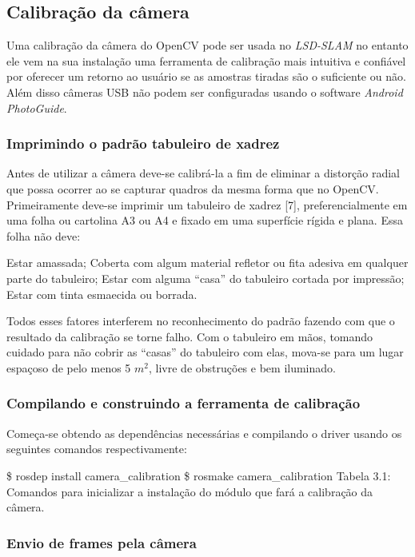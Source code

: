 \subsection{Calibração da câmera}

Uma calibração da câmera do OpenCV pode ser usada no \textit{LSD-SLAM} no entanto ele vem na sua instalação uma ferramenta de calibração mais intuitiva e confiável por oferecer um retorno ao usuário se as amostras tiradas são o suficiente ou não. Além disso câmeras USB não podem ser configuradas usando o software \textit{Android} \textit{PhotoGuide}.

\subsubsection{Imprimindo o padrão tabuleiro de xadrez}

Antes de utilizar a câmera deve-se calibrá-la a fim de eliminar a distorção radial que possa ocorrer ao se capturar quadros da mesma forma que no OpenCV.
Primeiramente deve-se imprimir um tabuleiro de xadrez [7], preferencialmente em uma folha ou cartolina A3 ou A4 e fixado em uma superfície rígida e plana. Essa folha não deve: 

Estar amassada;
Coberta com algum material refletor ou fita adesiva em qualquer parte do tabuleiro;
Estar com alguma “casa” do tabuleiro cortada por impressão;
Estar com tinta esmaecida ou borrada.

Todos esses fatores interferem no reconhecimento do padrão fazendo com que o resultado da calibração se torne falho. Com o tabuleiro em mãos, tomando cuidado para não cobrir as “casas” do tabuleiro com elas, mova-se para um lugar espaçoso de pelo menos 5 $m^2$, livre de obstruções e bem iluminado.

\subsubsection{Compilando e construindo a ferramenta de calibração}

Começa-se obtendo as dependências necessárias e compilando o driver usando os seguintes comandos respectivamente:

\$ rosdep install camera\_calibration
\$ rosmake camera\_calibration
Tabela 3.1: Comandos para inicializar a instalação do módulo que fará a calibração da câmera.

\subsubsection{Envio de frames pela câmera}

